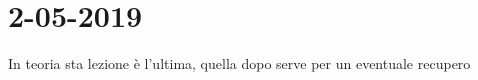 

\newpage
\section{2-05-2019}
\noindent In teoria sta lezione è l'ultima, quella dopo serve per un eventuale recupero

 


